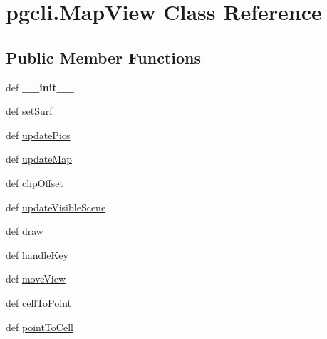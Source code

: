 \hypertarget{classpgcli_1_1_map_view}{\section{pgcli.\-Map\-View \-Class \-Reference}
\label{classpgcli_1_1_map_view}
}
\subsection*{\-Public \-Member \-Functions}
\begin{DoxyCompactItemize}
\item 
\hypertarget{classpgcli_1_1_map_view_abb21f80570cf7ea3824b951b806d6d8a}{def {\bfseries \-\_\-\-\_\-init\-\_\-\-\_\-}}\label{classpgcli_1_1_map_view_abb21f80570cf7ea3824b951b806d6d8a}

\item 
def \hyperlink{classpgcli_1_1_map_view_a7a7f3afb809bcf186185018f8e78f7c2}{set\-Surf}
\item 
def \hyperlink{classpgcli_1_1_map_view_a9d186f2b4e7dd519dc5ec6f5d8682754}{update\-Pics}
\item 
def \hyperlink{classpgcli_1_1_map_view_a61ef75055f398cacac1252ec7d5c31b7}{update\-Map}
\item 
def \hyperlink{classpgcli_1_1_map_view_ae3233acd0ec42de01ea8a90d2615dc1e}{clip\-Offset}
\item 
def \hyperlink{classpgcli_1_1_map_view_a666208c7ef026585b782ca3c3afe1b08}{update\-Visible\-Scene}
\item 
def \hyperlink{classpgcli_1_1_map_view_a08967b5a6a65c4ec77f289d1fffffb10}{draw}
\item 
def \hyperlink{classpgcli_1_1_map_view_adb5582ec6a6aa31110b024f53f843cb2}{handle\-Key}
\item 
def \hyperlink{classpgcli_1_1_map_view_a56301e8828e7de0be9f2c5fcc5602d07}{move\-View}
\item 
def \hyperlink{classpgcli_1_1_map_view_aa4b6e8f6951f2ade72bf15efacdef99b}{cell\-To\-Point}
\item 
def \hyperlink{classpgcli_1_1_map_view_a14a74a83706f4acfb7a18355ad72edce}{point\-To\-Cell}
\end{DoxyCompactItemize}
